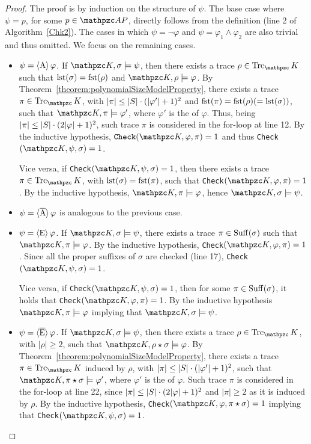 \begin{proof}
The proof is by induction on the structure of $\psi$.
 The base case where $\psi=p$, for some $p\in\Prop$, directly follows from the definition (line 2 of Algorithm~\ref{Chk2}).
  The cases in which $\psi=\neg\varphi$ and $\psi=\varphi_1\wedge\varphi_2$ are also trivial and thus omitted. We focus on the remaining cases.
\begin{itemize}
    \item $\psi=\operatorname{\langle A\rangle}\varphi$. If $\Ku,\sigma\models \psi$, then there exists a trace $\rho\in \Trk_\Ku$ such that $\operatorname{lst}(\sigma)=\operatorname{fst}(\rho)$ and $\Ku,\rho\models \varphi$.
    By Theorem~\ref{theorem:polynomialSizeModelProperty}, there exists a trace $\pi\in\Trk_\Ku$, with $|\pi|\leq |S|\cdot(|\varphi'|+1)^2$ and $\operatorname{fst}(\pi)=\operatorname{fst}(\rho)(=\operatorname{lst}(\sigma))$, such that $\Ku,\pi\models\varphi'$, where $\varphi'$ is the \nnf{} of $\varphi$. Thus, being $|\pi|\leq |S|\cdot(2|\varphi|+1)^2$, such trace $\pi$ is considered in the for-loop at line 12. By the inductive hypothesis, $\texttt{Check}(\Ku,\varphi,\pi)=1$ and thus \texttt{Check}$(\Ku,\psi,\sigma)=1$.

    Vice versa, if \texttt{Check}$(\Ku,\psi,\sigma)=1$, then there exists a trace $\pi\in \Trk_\Ku$, with $\operatorname{lst}(\sigma)=\operatorname{fst}(\pi)$, such that \texttt{Check}$(\Ku,\varphi,\pi)=1$. By the inductive hypothesis, $\Ku,\pi\models \varphi$, hence $\Ku,\sigma\models \psi$.

    \item $\psi=\operatorname{\langle \overline{A}\rangle}\varphi$ is analogous to the previous case.
    \item $\psi=\operatorname{\langle E\rangle}\varphi$. If $\Ku,\sigma\models \psi$, there exists a trace $\pi\in\operatorname{Suff}(\sigma)$ such that $\Ku,\pi\models \varphi$. By the inductive hypothesis, \texttt{Check}$(\Ku,\varphi,\pi)=1$. Since all the proper suffixes of $\sigma$ are checked (line 17), \texttt{Check}$(\Ku,\psi,\sigma)=1$.

    Vice versa, if \texttt{Check}$(\Ku,\psi,\sigma)=1$, then for some $\pi\in\operatorname{Suff}(\sigma)$, it holds that \texttt{Check}$(\Ku,\varphi,\pi)=1$. By the inductive hypothesis $\Ku,\pi\models \varphi$ implying that $\Ku,\sigma\models \psi$.
    \item $\psi=\operatorname{\langle \overline{E}\rangle}\varphi$. If $\Ku,\sigma\models \psi$, then there exists a trace $\rho\in \Trk_\Ku$, with $|\rho|\geq 2$, such that $\Ku,\rho\star\sigma\models \varphi$.
    By Theorem~\ref{theorem:polynomialSizeModelProperty}, there exists a trace $\pi\in\Trk_\Ku$ induced by $\rho$, with $|\pi|\leq |S|\cdot(|\varphi'|+1)^2$, such that $\Ku,\pi\star\sigma\models\varphi'$, where $\varphi'$ is the \nnf{} of $\varphi$. Such trace $\pi$ is considered in the for-loop at line 22, since $|\pi|\leq |S|\cdot(2|\varphi|+1)^2$ and $|\pi|\geq 2$ as it is induced by $\rho$. By the inductive hypothesis, \texttt{Check}$(\Ku,\varphi,\pi\star\sigma)=1$ implying that  \texttt{Check}$(\Ku,\psi,\sigma)=1$.


\end{itemize}
\end{proof}

